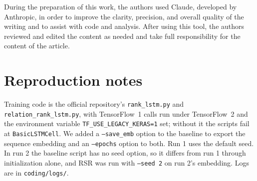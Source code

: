 \documentclass[12pt]{article}
\begin{document}
During the preparation of this work, the authors used Claude, developed by Anthropic, in order
to improve the clarity, precision, and overall quality of the writing and to assist with code
and analysis. After using this tool, the authors reviewed and edited the content as needed and
take full responsibility for the content of the article.






\appendix

\section{Reproduction notes}

Training code is the official repository's \texttt{rank\_lstm.py} and
\texttt{relation\_rank\_lstm.py}, with TensorFlow~1 calls run under TensorFlow~2 and the
environment variable \texttt{TF\_USE\_LEGACY\_KERAS=1} set; without it the scripts fail at
\texttt{BasicLSTMCell}. We added a \texttt{--save\_emb} option to the baseline to export the
sequence embedding and an \texttt{--epochs} option to both. Run 1 uses the default seed. In run 2
the baseline script has no seed option, so it differs from run 1 through initialization alone,
and RSR was run with \texttt{--seed 2} on run 2's embedding. Logs are in \texttt{coding/logs/}.
\end{document}
